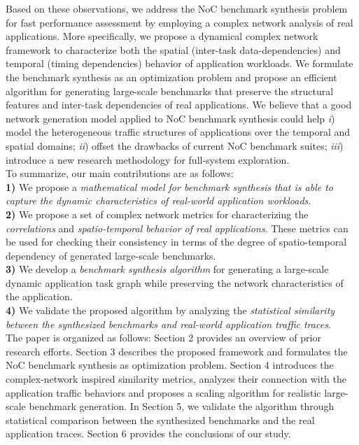\indent Based on these observations, we address the NoC benchmark synthesis problem for fast performance assessment by employing a complex network analysis of real applications. More specifically, we propose a dynamical complex network framework to characterize both the spatial (inter-task data-dependencies) and temporal (timing dependencies) behavior of application workloads. We formulate the benchmark synthesis as an optimization problem and propose an efficient algorithm for generating large-scale benchmarks that preserve the structural features and inter-task dependencies of real applications.  We believe that a good network generation model applied to NoC benchmark synthesis could help \textit{i}) model the heterogeneous traffic structures of applications over the temporal and spatial domains; \textit{ii}) offset the drawbacks of current NoC benchmark suites; \textit{iii}) introduce a new research methodology for full-system exploration.\\
\indent To summarize, our main contributions are as follows:\\
\noindent \textbf{1)} We propose a \textit{mathematical model for benchmark synthesis that is able to capture the dynamic characteristics of real-world application workloads}.\\
\noindent \textbf{2)} We propose a set of complex network metrics for characterizing the \textit{correlations} and \textit{spatio-temporal behavior of real applications}. These metrics can be used for checking their consistency in terms of the degree of spatio-temporal dependency of generated large-scale benchmarks.\\
\noindent \textbf{3)} We develop a \textit{benchmark synthesis algorithm} for generating a large-scale dynamic application task graph while preserving the network characteristics of the application.\\
\noindent \textbf{4)} We validate the proposed algorithm by analyzing the \textit{statistical similarity between the synthesized benchmarks and real-world application traffic traces}.\\
\indent The paper is organized as follows: Section 2 provides an overview of prior research efforts. Section 3 describes the proposed framework and formulates the NoC benchmark synthesis as optimization problem. Section 4 introduces the complex-network inspired similarity metrics, analyzes their connection with the application traffic behaviors and proposes a scaling algorithm for realistic large-scale benchmark generation. In Section 5, we validate the algorithm through statistical comparison between the synthesized benchmarks and the real application traces. Section 6 provides the conclusions of our study.
